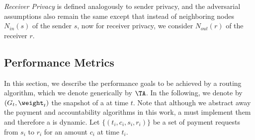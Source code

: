 \textit{Receiver Privacy} is defined analogously to sender privacy, and the adversarial assumptions also remain the same except that instead of 
neighboring nodes  $N_{\textit{in}}(s)$  of the sender $s$, now for receiver privacy, we  consider  $N_{\textit{out}}(r)$  of the receiver $r$.

\subsection{Performance Metrics}
In this section, we describe the performance goals to be achieved by a routing algorithm, which we 
denote generically by $\TA$. In the following, 
we denote by $(G_t, \weight_t)$ the snapshot of a \paysys at time $t$. Note that although 
we abstract away the payment and accountability algorithms in this work, a \paysys must 
implement them and therefore a \paysys is dynamic. Let $\{(t_i,c_i,s_i,r_i)\}$
be a set of payment requests from $s_i$ to $r_i$ for an amount $c_i$ at time $t_i$. 

